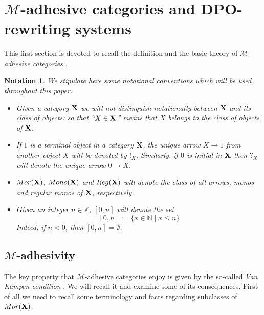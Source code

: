 \documentclass[a4paper,UKenglish,cleveref,pdftex, thm-restate,numberwithinsect]{lipics}
\newcommand{\mor}{\mathsf{Mor}}
\newcommand{\mon}{\mathsf{Mono}}
\newcommand{\reg}{\mathsf{Reg}}
\def\X{\textbf {\textup{X}}}
\def\Set{\textbf {\textup{Set}}}
\newtheorem*{notation}{Notation}
\begin{document}



\section{$\mathcal{M}$-adhesive categories and DPO-rewriting systems}\label{sec:ade}

This first section is devoted to recall the definition and the basic theory of \emph{$\mathcal{M}$-adhesive categories} \cite{azzi2019essence,ehrig2012,ehrig2014adhesive,lack2005adhesive}. 

\begin{notation} 
We stipulate here some notational conventions which will be used throughout this paper. 
\begin{itemize}\item 
	Given a category $\X$ we will not distinguish notationally between $\X$ and its class of objects: so that ``$X\in \X$'' means that $X$ belongs to the class of objects of $\X$.  
	\item 
	If $1$ is a terminal object in a category $\X$,  the unique arrow $X\to 1$ from another object $X$ will be denoted by $!_X$. Similarly, if $0$ is initial in $\X$ then $?_X$ will denote the unique arrow $0\to X$. %
	\item  $\mor(\X)$, $\mon(\X)$ and $\reg(\X)$ will denote the class of all arrows, monos and regular monos of $\X$, respectively.
	
	\item Given an integer $n\in \mathbb{Z}$, $[0,n]$ will denote the set
	\[[0,n]:=\{x\in \mathbb{N}\mid x\leq n\}\]
	Indeed, if $n<0$, then $[0,n]=\emptyset$.
\end{itemize}
\end{notation}


\subsection{$\mathcal{M}$-adhesivity}
The key property that $\mathcal{M}$-adhesive categories enjoy is given by  the so-called \emph{Van Kampen condition} \cite{brown1997van,johnstone2007quasitoposes,lack2005adhesive}. We will recall it and examine some of its consequences. First of all we need to recall some terminology and facts regarding subclasses of $\mor(\X)$.
\end{document}
